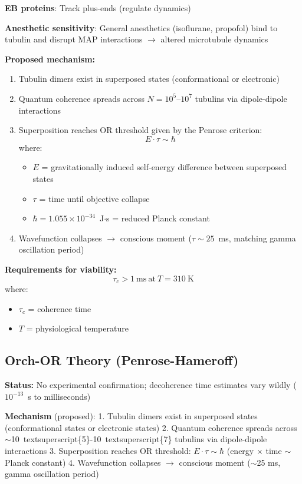 \textbf{EB proteins}: Track plus-ends (regulate dynamics)

\textbf{Anesthetic sensitivity}: General anesthetics (isoflurane,
propofol) bind to tubulin and disrupt MAP interactions
$\rightarrow$ altered microtubule dynamics

\textbf{Proposed mechanism:}
\begin{enumerate}
\item Tubulin dimers exist in superposed states (conformational or electronic)
\item Quantum coherence spreads across $N = 10^5$--$10^7$ tubulins via dipole-dipole interactions
\item Superposition reaches OR threshold given by the Penrose criterion:
\begin{equation}
E \cdot \tau \sim \hbar
\end{equation}
where:
\begin{itemize}
\item $E$ = gravitationally induced self-energy difference between superposed states
\item $\tau$ = time until objective collapse
\item $\hbar = 1.055 \times 10^{-34}$~J$\cdot$s = reduced Planck constant
\end{itemize}
\item Wavefunction collapses $\rightarrow$ conscious moment ($\tau \sim 25$~ms, matching gamma oscillation period)
\end{enumerate}

\textbf{Requirements for viability:}
\begin{equation}
\tau_c > 1\ \mathrm{ms}\ \text{at}\ T = 310\ \mathrm{K}
\end{equation}
where:
\begin{itemize}
\item $\tau_c$ = coherence time
\item $T$ = physiological temperature
\end{itemize}

\subsection{Orch-OR Theory
(Penrose-Hameroff)}\label{orch-or-theory-penrose-hameroff}

\textbf{Status:} No experimental confirmation; decoherence time estimates vary wildly ($10^{-13}$~s to milliseconds)

\textbf{Mechanism} (proposed): 1. Tubulin dimers exist in superposed
states (conformational states or electronic states) 2. Quantum coherence
spreads across
$\sim$10\ textsuperscript\{5\}-10\ textsuperscript\{7\}
tubulins via dipole-dipole interactions 3. Superposition reaches OR
threshold: \(E \cdot \tau \sim \hbar\) (energy $\times$
time $\sim${} Planck constant) 4. Wavefunction collapses
$\rightarrow$ conscious moment ($\sim$25 ms,
gamma oscillation period)

